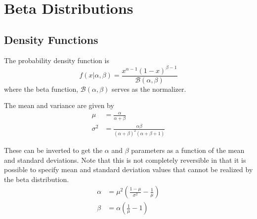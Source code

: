 \documentclass[../../main.tex]{subfiles}
\begin{document}
\chapter{Beta Distributions}

\section{Density Functions}
The probability density function is
\[
    f\left(x| \alpha, \beta \right) =
    \frac{
        x^{\alpha-1} (1 - x)^{\beta-1}
    }
    {
        \mathcal{B}(\alpha, \beta)
    }
\]
where the beta function, $\mathcal{B}(\alpha, \beta)$ serves as the
normalizer.

The mean and variance are given by
\begin{align}
    \mu &= \frac{\alpha }{ \alpha + \beta} \\
    \sigma^2 &= \frac{\alpha \beta}{ (\alpha + \beta)^2 (\alpha + \beta + 1)} 
\end{align}

These can be inverted to get the $\alpha$ and $\beta$ parameters as a function
of the mean and standard deviations.  Note that this is not completely
reversible in that it is possible to specify mean and standard deviation
values that cannot be realized by the beta distribution.
\begin{align}
    \alpha &= \mu^2\left( \frac{1-\mu}{\sigma^2} - \frac{1}{\mu} \right) \\
    \beta &= \alpha\left( \frac{1}{\mu}  - 1 \right)
\end{align}
\end{document}
